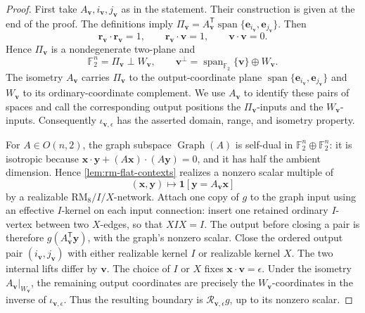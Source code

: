 \documentclass[11pt,letterpaper,onecolumn]{article}
\theoremstyle{plain}
\theoremstyle{definition}
\theoremstyle{remark}
\newcommand{\Ftwo}{\mathbb F_2}
\newcommand{\Span}{\operatorname{span}}
\newcommand{\one}{\mathbf 1}
\newcommand{\RMcore}{\mathrm{RM}_8}
\begin{document}
\begin{proof}
First take \(A_{\mathbf{v}},i_{\mathbf{v}},j_{\mathbf{v}}\) as in the statement. Their construction is
given at the end of the proof.  The definitions imply
\(\Pi_{\mathbf{v}}=A_{\mathbf{v}}^{\mathsf T}\Span\{{\mathbf{e}}_{i_{\mathbf{v}}},{\mathbf{e}}_{j_{\mathbf{v}}}\}\).
Then
\[
 {\mathbf{r}}_{\mathbf{v}}\cdot {\mathbf{r}}_{\mathbf{v}}=1,\qquad
 {\mathbf{r}}_{\mathbf{v}}\cdot {\mathbf{v}}=1,\qquad
 {\mathbf{v}}\cdot {\mathbf{v}}=0.
\]
Hence \(\Pi_{\mathbf{v}}\) is a nondegenerate two-plane and
\[
 \Ftwo^n=\Pi_{\mathbf{v}}\perp W_{\mathbf{v}},
 \qquad
 {\mathbf{v}}^\perp=\Span_{\Ftwo}\{{\mathbf{v}}\}\oplus W_{\mathbf{v}}.
\]
The isometry \(A_{\mathbf{v}}\) carries \(\Pi_{\mathbf{v}}\) to the output-coordinate
plane \(\Span\{{\mathbf{e}}_{i_{\mathbf{v}}},{\mathbf{e}}_{j_{\mathbf{v}}}\}\) and \(W_{\mathbf{v}}\) to its ordinary-coordinate
complement.  We use \(A_{\mathbf{v}}\) to identify these pairs of spaces and call the
corresponding output positions the \(\Pi_{\mathbf{v}}\)-inputs and the \(W_{\mathbf{v}}\)-inputs.
Consequently \(\iota_{{\mathbf{v}},\epsilon}\) has the asserted domain, range,
and isometry property.

For \(A\in O(n,2)\), the graph subspace \(\operatorname{Graph}(A)\)
is self-dual in \(\Ftwo^n\oplus\Ftwo^n\): it is isotropic
because
\({\mathbf{x}}\cdot {\mathbf{y}}+(A{\mathbf{x}})\cdot(A{\mathbf{y}})=0\), and it has half the ambient dimension.
Hence \cref{lem:rm-flat-contexts} realizes a nonzero scalar multiple of
\[
 ({\mathbf{x}},{\mathbf{y}})\longmapsto\one[{\mathbf{y}}=A_{\mathbf{v}}{\mathbf{x}}]
\]
by a realizable \(\RMcore/I/X\)-network.  Attach one copy of \(g\) to the
graph input using an effective \(I\)-kernel on each input connection:
insert one retained ordinary \(I\)-vertex between two \(X\)-edges,
so that \(XIX=I\).  The output before closing a pair is therefore
\(g(A_{\mathbf{v}}^{\mathsf T}{\mathbf{y}})\), with the graph's nonzero scalar.
Close the ordered output pair \((i_{\mathbf{v}},j_{\mathbf{v}})\) with either realizable kernel
\(I\) or realizable kernel \(X\).  The two internal lifts differ by
\({\mathbf{v}}\). The choice of \(I\) or \(X\) fixes \({\mathbf{x}}\cdot {\mathbf{v}}=\epsilon\).  Under the
isometry \(A_{\mathbf{v}}|_{W_{\mathbf{v}}}\), the remaining output coordinates are precisely
the \(W_{\mathbf{v}}\)-coordinates in the inverse of \(\iota_{{\mathbf{v}},\epsilon}\).  Thus the
resulting boundary is \(\mathcal R_{{\mathbf{v}},\epsilon}g\), up to its nonzero scalar.


\end{proof}
\end{document}
